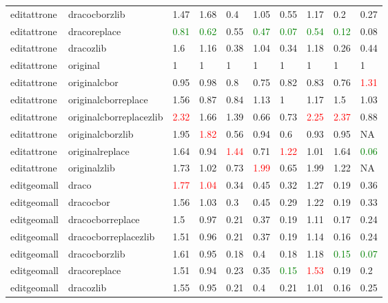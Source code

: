 \begin{landscape}
\begin{longtable}{llllllllll}
editattrone & dracocborzlib & 1.47 & 1.68 & 0.4 & 1.05 & 0.55 & 1.17 & 0.2 & 0.27\\
editattrone & dracoreplace & \textcolor{green}{0.81} & \textcolor{green}{0.62} & 0.55 & \textcolor{green}{0.47} & \textcolor{green}{0.07} & \textcolor{green}{0.54} & \textcolor{green}{0.12} & 0.08\\
editattrone & dracozlib & 1.6 & 1.16 & 0.38 & 1.04 & 0.34 & 1.18 & 0.26 & 0.44\\
editattrone & original & 1 & 1 & 1 & 1 & 1 & 1 & 1 & 1\\
editattrone & originalcbor & 0.95 & 0.98 & 0.8 & 0.75 & 0.82 & 0.83 & 0.76 & \textcolor{red}{1.31}\\
editattrone & originalcborreplace & 1.56 & 0.87 & 0.84 & 1.13 & 1 & 1.17 & 1.5 & 1.03\\
\rowcolor{lightgray}  editattrone & originalcborreplacezlib & \textcolor{red}{2.32} & 1.66 & 1.39 & 0.66 & 0.73 & \textcolor{red}{2.25} & \textcolor{red}{2.37} & 0.88\\
\rowcolor{lightgray}  editattrone & originalcborzlib & 1.95 & \textcolor{red}{1.82} & 0.56 & 0.94 & 0.6 & 0.93 & 0.95 & NA\\
\rowcolor{lightgray}  editattrone & originalreplace & 1.64 & 0.94 & \textcolor{red}{1.44} & 0.71 & \textcolor{red}{1.22} & 1.01 & 1.64 & \textcolor{green}{0.06}\\
\rowcolor{lightgray}  editattrone & originalzlib & 1.73 & 1.02 & 0.73 & \textcolor{red}{1.99} & 0.65 & 1.99 & 1.22 & NA\\
\rowcolor{lightgray}  editgeomall & draco & \textcolor{red}{1.77} & \textcolor{red}{1.04} & 0.34 & 0.45 & 0.32 & 1.27 & 0.19 & 0.36\\
\rowcolor{lightgray}  editgeomall & dracocbor & 1.56 & 1.03 & 0.3 & 0.45 & 0.29 & 1.22 & 0.19 & 0.33\\
\rowcolor{lightgray}  editgeomall & dracocborreplace & 1.5 & 0.97 & 0.21 & 0.37 & 0.19 & 1.11 & 0.17 & 0.24\\
\rowcolor{lightgray}  editgeomall & dracocborreplacezlib & 1.51 & 0.96 & 0.21 & 0.37 & 0.19 & 1.14 & 0.16 & 0.24\\
\rowcolor{lightgray}  editgeomall & dracocborzlib & 1.61 & 0.95 & 0.18 & 0.4 & 0.18 & 1.18 & \textcolor{green}{0.15} & \textcolor{green}{0.07}\\
\rowcolor{lightgray}  editgeomall & dracoreplace & 1.51 & 0.94 & 0.23 & 0.35 & \textcolor{green}{0.15} & \textcolor{red}{1.53} & 0.19 & 0.2\\
\rowcolor{lightgray}  editgeomall & dracozlib & 1.55 & 0.95 & 0.21 & 0.4 & 0.21 & 1.01 & 0.16 & 0.25\\

\end{longtable}
\end{landscape}
